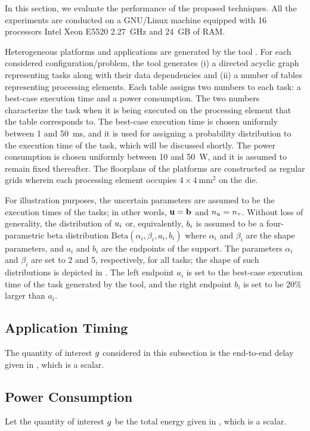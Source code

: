 In this section, we evaluate the performance of the proposed techniques. All the
experiments are conducted on a GNU/Linux machine equipped with 16 processors
Intel Xeon E5520 2.27~GHz and 24~GB of RAM.

Heterogeneous platforms and applications are generated by the  tool
\cite{dick1998}. For each considered configuration/problem, the tool generates
(i) a directed acyclic graph representing tasks along with their data
dependencies and (ii) a number of tables representing processing elements. Each
table assigns two numbers to each task: a best-case execution time and a power
consumption. The two numbers characterize the task when it is being executed on
the processing element that the table corresponds to. The best-case execution
time is chosen uniformly between 1 and 50~ms, and it is used for assigning a
probability distribution to the execution time of the task, which will be
discussed shortly. The power consumption is chosen uniformly between 10 and
50~W, and it is assumed to remain fixed thereafter. The floorplans of the
platforms are constructed as regular grids wherein each processing element
occupies $4 \times 4~\text{mm}^2$ on the die.


For illustration purposes, the uncertain parameters are assumed to be the
execution times of the tasks; in other words, $\mathbf{u} = \mathbf{b}$ and ${n_u} = {n_\tau}$.
Without loss of generality, the distribution of $u_i$ or, equivalently, $b_i$
is assumed to be a four-parametric beta distribution $\text{Beta}(\alpha_i,
\beta_i, a_i, b_i)$ where $\alpha_i$ and $\beta_i$ are the shape parameters, and
$a_i$ and $b_i$ are the endpoints of the support. The parameters $\alpha_i$ and
$\beta_i$ are set to 2 and 5, respectively, for all tasks; the shape of such
distributions is depicted in . The left endpoint $a_i$ is set to the
best-case execution time of the task generated by the  tool, and the
right endpoint $b_i$ is set to be 20\% larger than $a_i$.

\subsection{Application Timing}
The quantity of interest $g$ considered in this subsection is the end-to-end
delay given in , which is a scalar.

\subsection{Power Consumption}
Let the quantity of interest $g$ be the total energy given in
, which is a scalar.

